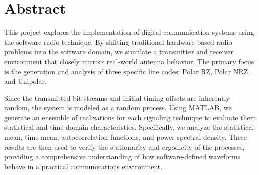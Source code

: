 \thispagestyle{plain}

\chapter*{Abstract}
This project explores the implementation of digital communication systems using the software radio technique. By shifting traditional hardware-based radio problems into the software domain, we simulate a transmitter and receiver environment that closely mirrors real-world antenna behavior. The primary focus is the generation and analysis of three specific line codes: Polar RZ, Polar NRZ, and Unipolar.

Since the transmitted bit-streams and initial timing offsets are inherently
random, the system is modeled as a random process. Using MATLAB, we generate an
ensemble of realizations for each signaling technique to evaluate their
statistical and time-domain characteristics. Specifically, we analyze the
statistical mean, time mean, autocorrelation functions, and power spectral
density. These results are then used to verify the stationarity and ergodicity
of the processes, providing a comprehensive understanding of how
software-defined waveforms behave in a practical communications environment.